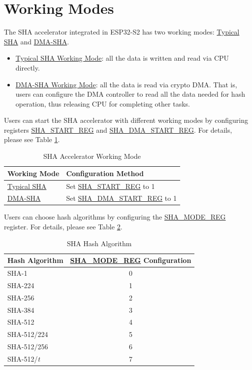 \documentclass[main\_\_EN.tex]{subfiles}
\begin{document}
\section{Working Modes}
The SHA accelerator integrated in ESP32-S2 has two working modes: \hyperref[subsection:typicalsha]{Typical SHA} and \hyperref[subsection:dma-sha]{DMA-SHA}.

\begin{itemize}
    \item \hyperref[subsection:typicalsha]{Typical SHA Working Mode}: all the data is written and read via CPU directly.
    \item \hyperref[subsection:dma-sha]{DMA-SHA Working Mode}: all the data is read via crypto DMA. That is, users can configure the DMA controller to read all the data needed for hash operation, thus releasing CPU for completing other tasks.
\end{itemize}

Users can start the SHA accelerator with different working modes by configuring registers \hyperref[regdesc:SHASTARTREG]{SHA\_START\_REG} and \hyperref[regdesc:SHADMASTARTREG]{SHA\_DMA\_START\_REG}. For details, please see Table \ref{table:SHA_DMA_ENABLE}.

\begin{longtable}[c]{ | l | l | }
\caption{SHA Accelerator Working Mode}
\label{table:SHA_DMA_ENABLE}
\\\hline
\rowcolor{lightgray}
Working Mode      & Configuration Method\\
    \hline
    \hyperref[subsection:typicalsha]{Typical SHA}      &  Set \hyperref[regdesc:SHASTARTREG]{SHA\_START\_REG} to 1   \\
    \hline
    \hyperref[subsection:dma-sha]{DMA-SHA}           &  Set \hyperref[regdesc:SHADMASTARTREG]{SHA\_DMA\_START\_REG} to 1   \\
    \hline
\end{longtable}

Users can choose hash algorithms by configuring the \hyperref[regdesc:SHAMODEREG]{SHA\_MODE\_REG} register. For details, please see Table \ref{table:mode summary}.

\begin{longtable}[c]{| l | c |}
\caption{SHA Hash Algorithm}
\label{table:mode summary}
\\\hline
\rowcolor{lightgray}
Hash Algorithm & \hyperref[regdesc:SHAMODEREG]{SHA\_MODE\_REG} Configuration\\
    \hline
    SHA-1 & 0\\
    \hline
    SHA-224 & 1\\
    \hline
    SHA-256 & 2\\
    \hline
    SHA-384 & 3\\
    \hline
    SHA-512 & 4\\
    \hline
    SHA-512/224 & 5\\
    \hline
    SHA-512/256 & 6\\
    \hline
    SHA-512/{\it{t}} & 7\\
    \hline
\end{longtable}
\end{document}
